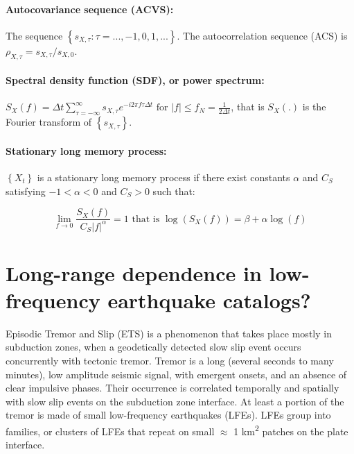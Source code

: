 \documentclass[workdone.tex]{subfiles}
\begin{document}
\paragraph{Autocovariance sequence (ACVS):} The sequence $\left\{ s_{X , \tau} : \tau = ... , -1 , 0 , 1 , ... \right\}$. The autocorrelation sequence (ACS) is $\rho_{X , \tau} = s_{X , \tau } / s_{X , 0}$.

\paragraph{Spectral density function (SDF), or power spectrum:} $S_X \left( f \right) = \Delta t \sum_{\tau = - \infty}^{\infty} s_{X , \tau} e^{- i 2 \pi f \tau \Delta t} \text{ for } \left| f \right| \leq f_N = \frac{1}{2 \Delta t}$, that is $S_X \left( . \right)$ is the Fourier transform of $\left\{ s_{X , \tau} \right\}$.

\paragraph{Stationary long memory process:} $\left\{ X_t \right\}$ is a stationary long memory process if there exist constants $\alpha$ and $C_S$ satisfying $ -1 < \alpha < 0$ and $C_S > 0$ such that:

\begin{equation}
\lim_{f \to 0} \frac{S_X \left( f \right)}{C_S \left| f \right| ^{\alpha}} = 1 \text{ that is } \log \left( S_X \left( f \right) \right) = \beta + \alpha \log \left( f \right)
\end{equation}

\newpage

\section{Long-range dependence in low-frequency earthquake catalogs?}

Episodic Tremor and Slip (ETS) is a phenomenon that takes place mostly in subduction zones, when a geodetically detected slow slip event occurs concurrently with tectonic tremor. Tremor is a long (several seconds to many minutes), low amplitude seismic signal, with emergent onsets, and an absence of clear impulsive phases. Their occurrence is correlated temporally and spatially with slow slip events on the subduction zone interface. At least a portion of the tremor is made of small low-frequency earthquakes (LFEs). LFEs group into families, or clusters of LFEs that repeat on small $\approx$ 1 km\textsuperscript{2} patches on the plate interface. \\
\end{document}
